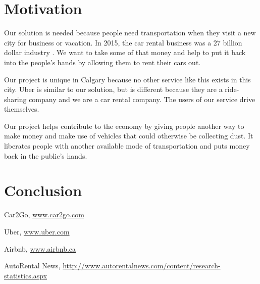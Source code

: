\documentclass{article}
\begin{document}
\section{Motivation}
Our solution is needed because people need transportation when they visit a new
city for business or vacation. In 2015, the car rental business was a 27
billion dollar industry \cite{marketdata}. We want to take some of that money
and help to put it back into the people's hands by allowing them to rent their
cars out.

Our project is unique in Calgary because no other service like this exists in
this city. Uber is similar to our solution, but is different because they are a
ride-sharing company and we are a car rental company. The users of our service
drive themselves.

Our project helps contribute to the economy by giving people another way to
make money and make use of vehicles that could otherwise be collecting dust. It
liberates people with another available mode of transportation and puts money
back in the public's hands.

\section{Conclusion}
\begin{thebibliography}{9}

  Car2Go,
  \url{www.car2go.com}

  Uber,
  \url{www.uber.com}

  Airbnb,
  \url{www.airbnb.ca}

  AutoRental News,
  \url{http://www.autorentalnews.com/content/research-statistics.aspx}

\end{thebibliography}
\end{document}

